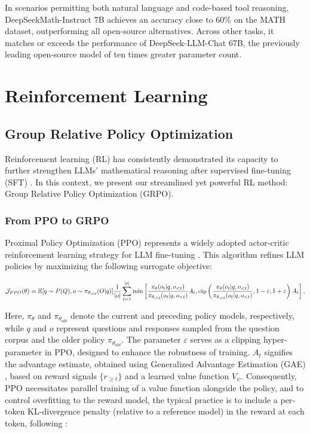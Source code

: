 \begin{itemize}[topsep=0pt]
In scenarios permitting both natural language and code-based tool reasoning, DeepSeekMath-Instruct 7B achieves an accuracy close to 60\% on the MATH dataset, outperforming all open-source alternatives. Across other tasks, it matches or exceeds the performance of DeepSeek-LLM-Chat 67B, the previously leading open-source model of ten times greater parameter count.

\section{Reinforcement Learning}

\subsection{Group Relative Policy Optimization} Reinforcement learning (RL) has consistently demonstrated its capacity to further strengthen LLMs' mathematical reasoning after supervised fine-tuning (SFT) \citep{wang2023math, wizardmath}. In this context, we present our streamlined yet powerful RL method: Group Relative Policy Optimization (GRPO).

\subsubsection{From PPO to GRPO} Proximal Policy Optimization (PPO) \citep{schulman2017proximal} represents a widely adopted actor-critic reinforcement learning strategy for LLM fine-tuning \citep{ouyang2022training}. This algorithm refines LLM policies by maximizing the following surrogate objective:

\begin{equation}
\footnotesize
    \mathcal{J}_{PPO}(\theta) = \mathbb{E}{[q \sim P(Q), o \sim \pi_{\theta_{old}}(O|q)]} \frac{1}{|o|} \sum_{t=1}^{|o|} \min \left[ \frac{\pi_\theta(o_{t} | q, o_{<t})}{\pi_{\theta_{old}}(o_{t} | q, o_{<t})} A_{t}, \text{clip} \left( \frac{\pi_\theta(o_{t} | q, o_{<t})}{\pi_{\theta_{old}}(o_{t} | q, o_{<t})}, 1 - \varepsilon, 1 + \varepsilon \right)  A_{t} \right] ,
\end{equation}

Here, $\pi_{\theta}$ and $\pi_{\theta_{old}}$ denote the current and preceding policy models, respectively, while $q$ and $o$ represent questions and responses sampled from the question corpus and the older policy $\pi_{\theta_{old}}$. The parameter $\varepsilon$ serves as a clipping hyper-parameter in PPO, designed to enhance the robustness of training. $A_t$ signifies the advantage estimate, obtained using Generalized Advantage Estimation (GAE) \citep{gae}, based on reward signals $\{r_{\ge t}\}$ and a learned value function $V_{\psi}$. Consequently, PPO necessitates parallel training of a value function alongside the policy, and to control overfitting to the reward model, the typical practice is to include a per-token KL-divergence penalty (relative to a reference model) in the reward at each token, following \citep{ouyang2022training}:


\end{itemize}
